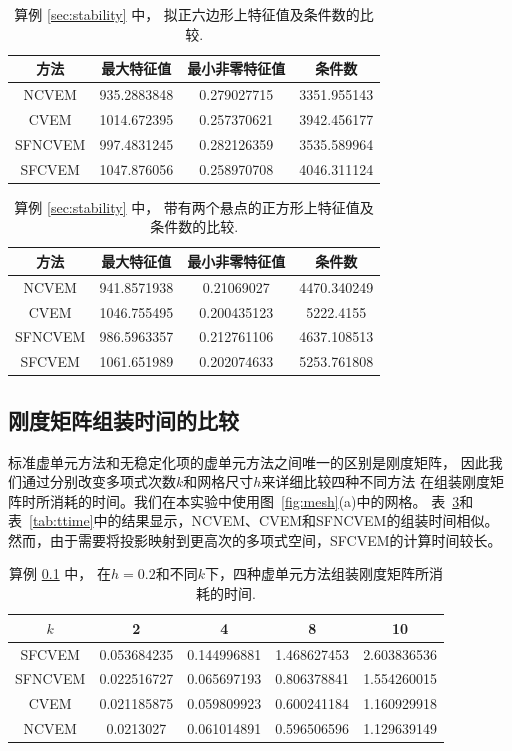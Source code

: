 \begin{table}[htbp]
\centering
\caption{算例 \ref{sec:stability} 中，
拟正六边形上特征值及条件数的比较.}
\label{tab:comparison1}
\begin{tabular}{c|c c c}
\hline
\textbf{方法} & \textbf{最大特征值} & \textbf{最小非零特征值} & \textbf{条件数} \\\hline
NCVEM  & 935.2883848 & 0.279027715 & 3351.955143 \\\hline
CVEM   & 1014.672395 & 0.257370621 & 3942.456177 \\\hline
SFNCVEM & 997.4831245 & 0.282126359 & 3535.589964 \\\hline
SFCVEM  & 1047.876056 & 0.258970708 & 4046.311124 \\\hline
\end{tabular}
\end{table}

\begin{table}[htbp]
\centering
\caption{算例 \ref{sec:stability} 中，
带有两个悬点的正方形上特征值及条件数的比较.}
\label{tab:comparison2}
\begin{tabular}{c|c c c}
\hline
\textbf{方法} & \textbf{最大特征值} & \textbf{最小非零特征值} & \textbf{条件数} \\\hline
NCVEM  & 941.8571938 & 0.21069027 & 4470.340249 \\\hline
CVEM   & 1046.755495 & 0.200435123 & 5222.4155 \\\hline
SFNCVEM & 986.5963357 & 0.212761106 & 4637.108513 \\\hline
SFCVEM  & 1061.651989 & 0.202074633 & 5253.761808 \\\hline
\end{tabular}
\end{table}

\subsection{刚度矩阵组装时间的比较}
\label{sec:stiffnessmatrixassembly}
标准虚单元方法和无稳定化项的虚单元方法之间唯一的区别是刚度矩阵，
因此我们通过分别改变多项式次数$k$和网格尺寸$h$来详细比较四种不同方法 
在组装刚度矩阵时所消耗的时间。我们在本实验中使用图~\ref{fig:mesh}(a)中的网格。
表~\ref{tab:ptime}和表~\ref{tab:ttime}中的结果显示，NCVEM、CVEM和SFNCVEM的组装时间相似。
然而，由于需要将投影映射到更高次的多项式空间，SFCVEM的计算时间较长。

\begin{table}[H]
    \caption{算例 \ref{sec:stiffnessmatrixassembly} 中，
    在$h=0.2$和不同$k$下，四种虚单元方法组装刚度矩阵所消耗的时间.}
\label{tab:ptime}
\centering
\begin{tabular}{c|cccc}
\hline
$k$ & 2 & 4 & 8 & 10 \\
\hline
SFCVEM & 0.053684235 & 0.144996881 & 1.468627453 & 2.603836536 \\
SFNCVEM & 0.022516727 & 0.065697193 & 0.806378841 & 1.554260015 \\
CVEM & 0.021185875 & 0.059809923 & 0.600241184 & 1.160929918 \\
NCVEM & 0.0213027 & 0.061014891 & 0.596506596 & 1.129639149 \\
\hline
\end{tabular}
\end{table}

